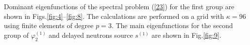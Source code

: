 \documentclass[authoryear]{elsarticle}
\begin{document}
Dominant eigenfunctions of the spectral problem (\ref{23}) for the first group are shown in Figs.\ref{fig:4}--\ref{fig:8}. 
The calculations are performed on a grid with $\kappa=96$ using finite elements of degree $p=3$.
The main eigenfunctions for the second group of  $\varphi^{(1)}_2$ and delayed neutrons source $s^{(1)}$  are shown in Fig.\ref{fig:9}. 

\begin{figure}[!h]
  \begin{center}
\begin{minipage}{0.49\linewidth}
 \\
\end{minipage}
\hfill
\begin{minipage}{0.49\linewidth}
 \\

\end{minipage}
\end{center}
\end{figure}
\end{document}
